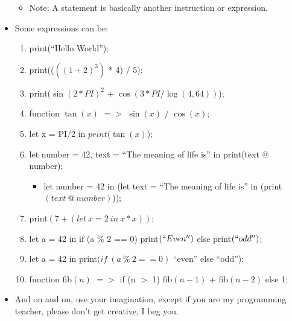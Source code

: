 \begin{itemize}
\begin{itemize}
\begin{itemize}
\begin{description}
                        \end{description}
                    \end{itemize}
                \item Note: A statement is basically another instruction or expression.
            \end{itemize}
        \newpage
        \item Some expressions can be:
            \begin{enumerate}
                \item print{(``Hello World'')};
                \item print{(($({(1 + 2)} ^ 3)$ * 4) / 5)};
                \item print{($\sin{(2 * PI)}^2$ + $\cos(3 * PI / \log(4, 64))$)};
                \item function $\tan{{(x)}}$ $=>$ $\sin{{(x)}}$ / $\cos{{(x)}}$;
                \item let x = PI/2 in $print(\tan{(x)}$);
                \item let number = 42, text = ``The meaning of life is'' in print{(text @ number)};
                    \begin{itemize}
                        \item let number = 42 in (let text = ``The meaning of life is'' in (print$(text \ @ \ number)$));
                    \end{itemize}
                \item print$(7 + (let \ x = 2 \ in \ x * x))$;
                \item let a = 42 in if (a \% 2 == 0) print$(``Even'')$ else print$(``odd'')$;
                \item let a = 42 in print$(if \ (a \ \% \ 2 == 0)$ ``even'' else ``odd'');
                \item function fib$(n)$ $=>$ if (n $>$ 1) fib$(n-1)$ + fib$(n-2)$ else 1;
            \end{enumerate}
        \item And on and on, use your imagination, except if you are my programming teacher, please don't get creative, I beg you.
     \end{itemize}